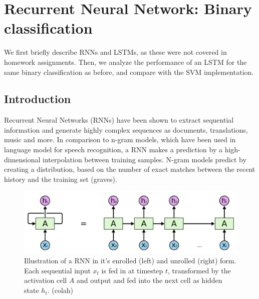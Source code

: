 
\section{Recurrent Neural Network: Binary classification} \label{sec:rnn_clf}

We first briefly describe RNNs and LSTMs, as these were not covered in homework assignments.
Then, we analyze the performance of an LSTM for the same binary classification as before, and compare with the SVM implementation.

\subsection{Introduction}

Recurrent Neural Networks (RNNs) have been shown to extract sequential information and generate highly complex sequences as documents, translations, music and more.
In comparison to n-gram models, which have been used in language model for speech recognition, a RNN makes a prediction by a high-dimensional interpolation between training samples.
N-gram models predict by creating a distribution, based on the number of exact matches between the recent history and the training set (graves). 

\begin{figure}
	\centering
	\includegraphics [trim=0 0 0 0, clip, angle=0, width=0.8\columnwidth,
	keepaspectratio]{figures/rnn_unrolled}
	\caption{Illustration of a RNN in it's enrolled (left) and unrolled (right) form. Each sequential input $x_t$ is fed in at timestep $t$, transformed by the activation cell $A$ and output and fed into the next cell as hidden state $h_t$. (colah)} 
	\label{fig:rnn_unrolled} 
\end{figure}


